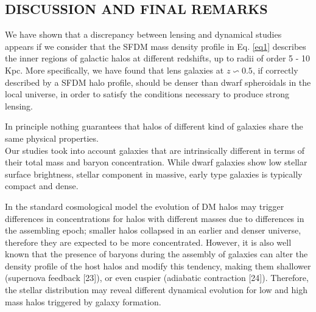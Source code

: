 \documentclass[10pt,a4paper]{article}
\begin{document}
\begin{multicols}{2}

\section{DISCUSSION AND FINAL REMARKS}

We have shown that a discrepancy between lensing and dynamical studies appears if we consider that the SFDM mass density profile in Eq. \eqref{eq1} describes the inner regions of galactic halos at different redshifts, up to radii of order 5 - 10 Kpc. More specifically, we have found that lens galaxies at $z \backsim 0.5$, if correctly described by a SFDM halo profile, should be denser than dwarf spheroidals in the local universe, in order to satisfy the conditions necessary to produce strong lensing.\

In principle nothing guarantees that halos of different kind of galaxies share the same physical properties.\\
Our studies took into account galaxies that are intrinsically different in terms of their total mass and baryon concentration. While dwarf galaxies show low stellar surface brightness, stellar component in massive, early type galaxies is typically compact and dense.\

In the standard cosmological model the evolution of DM halos may trigger differences in concentrations for halos with different masses due to differences in the assembling epoch; smaller halos collapsed in an earlier and denser universe, therefore they are expected to be more concentrated. However, it is also well known that the presence of baryons during the assembly of galaxies can alter the density profile of the host halos and modify this tendency, making them shallower (supernova feedback [23]), or even cuspier (adiabatic contraction [24]). Therefore, the stellar distribution may reveal different dynamical evolution for low and high mass halos triggered by galaxy formation.\


\end{multicols}
\end{document}
